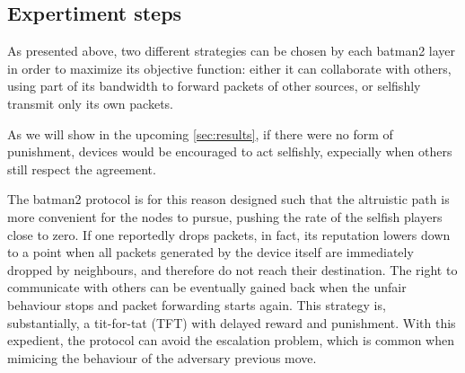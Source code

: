 \documentclass[conference,10.5pt]{IEEEtran}
\begin{document}
\begin{table}[h]
\vspace{0.3cm}
\vspace{0.1cm}
\caption{Relevant parameters for building the network}
\label{tab:params}
\end{table}

\clearpage
\subsection{Expertiment steps}

As presented above, two different strategies can be chosen by each \gls{batman2} layer in order to maximize its objective function: either it can collaborate with others, using part of its bandwidth to forward packets of other sources, or selfishly transmit only its own packets.

As we will show in the upcoming \autoref{sec:results}, if there were no form of punishment, devices would be encouraged to act selfishly, expecially when others still respect the agreement.

The \gls{batman2} protocol is for this reason designed such that the altruistic path is more convenient for the nodes to pursue, pushing the rate of the selfish players close to zero.
If one reportedly drops packets, in fact, its reputation lowers down to a point when all packets generated by the device itself are immediately dropped by neighbours, and therefore do not reach their destination. The right to communicate with others can be eventually gained back when the unfair behaviour stops and packet forwarding starts again.
This strategy is, substantially, a tit-for-tat (TFT) with delayed reward and punishment.
With this expedient, the protocol can avoid the escalation problem, which is common when mimicing the behaviour of the adversary previous move.
\end{document}
